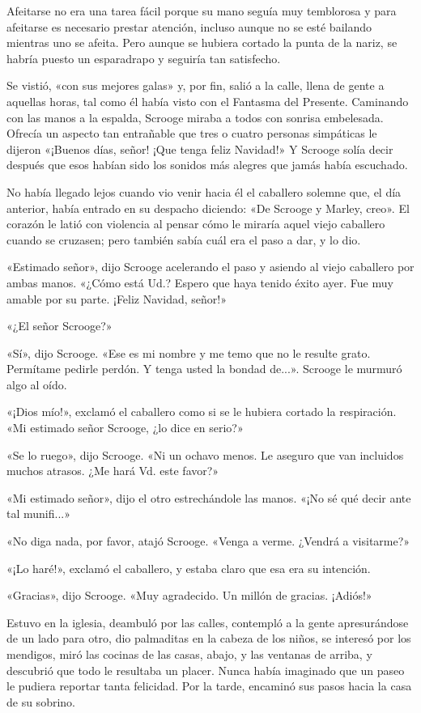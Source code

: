 \documentclass{novela}
\begin{document}
 Afeitarse no era una tarea fácil porque su mano seguía muy temblorosa y para afeitarse es necesario prestar atención, incluso aunque no se esté bailando mientras uno se afeita. Pero aunque se hubiera cortado la punta de la nariz, se habría puesto un esparadrapo y seguiría tan satisfecho.

 Se vistió, «con sus mejores galas» y, por fin, salió a la calle, llena de gente a aquellas horas, tal como él había visto con el Fantasma del Presente. Caminando con las manos a la espalda, Scrooge miraba a todos con sonrisa embelesada. Ofrecía un aspecto tan entrañable que tres o cuatro personas simpáticas le dijeron «¡Buenos días, señor! ¡Que tenga feliz Navidad!» Y Scrooge solía decir después que esos habían sido los sonidos más alegres que jamás había escuchado.

 No había llegado lejos cuando vio venir hacia él el caballero solemne que, el día anterior, había entrado en su despacho diciendo: «De Scrooge y Marley, creo». El corazón le latió con violencia al pensar cómo le miraría aquel viejo caballero cuando se cruzasen; pero también sabía cuál era el paso a dar, y lo dio.



 «Estimado señor», dijo Scrooge acelerando el paso y asiendo al viejo caballero por ambas manos. «¿Cómo está Ud.? Espero que haya tenido éxito ayer. Fue muy amable por su parte. ¡Feliz Navidad, señor!»

 «¿El señor Scrooge?»

 «Sí», dijo Scrooge. «Ese es mi nombre y me temo que no le resulte grato. Permítame pedirle perdón. Y tenga usted la bondad de...». Scrooge le murmuró algo al oído.

 «¡Dios mío!», exclamó el caballero como si se le hubiera cortado la respiración. «Mi estimado señor Scrooge, ¿lo dice en serio?»

 «Se lo ruego», dijo Scrooge. «Ni un ochavo menos. Le aseguro que van incluidos muchos atrasos. ¿Me hará Vd. este favor?»

 «Mi estimado señor», dijo el otro estrechándole las manos. «¡No sé qué decir ante tal munifi...»

 «No diga nada, por favor, atajó Scrooge. «Venga a verme. ¿Vendrá a visitarme?»

 «¡Lo haré!», exclamó el caballero, y estaba claro que esa era su intención.

 «Gracias», dijo Scrooge. «Muy agradecido. Un millón de gracias. ¡Adiós!»

 Estuvo en la iglesia, deambuló por las calles, contempló a la gente apresurándose de un lado para otro, dio palmaditas en la cabeza de los niños, se interesó por los mendigos, miró las cocinas de las casas, abajo, y las ventanas de arriba, y descubrió que todo le resultaba un placer. Nunca había imaginado que un paseo le pudiera reportar tanta felicidad. Por la tarde, encaminó sus pasos hacia la casa de su sobrino.
\end{document}
